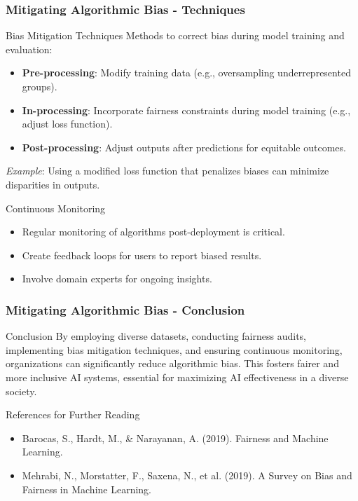\documentclass{beamer}
\begin{document}
\begin{frame}[fragile]
    \frametitle{Mitigating Algorithmic Bias - Techniques}
    \begin{block}{Bias Mitigation Techniques}
        Methods to correct bias during model training and evaluation:
        \begin{itemize}
            \item \textbf{Pre-processing}: Modify training data (e.g., oversampling underrepresented groups).
            \item \textbf{In-processing}: Incorporate fairness constraints during model training (e.g., adjust loss function).
            \item \textbf{Post-processing}: Adjust outputs after predictions for equitable outcomes.
        \end{itemize}
        \textit{Example}: Using a modified loss function that penalizes biases can minimize disparities in outputs.
    \end{block}

    \begin{block}{Continuous Monitoring}
        \begin{itemize}
            \item Regular monitoring of algorithms post-deployment is critical.
            \item Create feedback loops for users to report biased results. 
            \item Involve domain experts for ongoing insights.
        \end{itemize}
    \end{block}
\end{frame}

\begin{frame}[fragile]
    \frametitle{Mitigating Algorithmic Bias - Conclusion}
    \begin{block}{Conclusion}
        By employing diverse datasets, conducting fairness audits, implementing bias mitigation techniques, 
        and ensuring continuous monitoring, organizations can significantly reduce algorithmic bias. 
        This fosters fairer and more inclusive AI systems, essential for maximizing AI effectiveness in a diverse society.
    \end{block}

    \begin{block}{References for Further Reading}
        \begin{itemize}
            \item Barocas, S., Hardt, M., \& Narayanan, A. (2019). Fairness and Machine Learning.
            \item Mehrabi, N., Morstatter, F., Saxena, N., et al. (2019). A Survey on Bias and Fairness in Machine Learning.
        \end{itemize}
    \end{block}
\end{frame}
\end{document}
